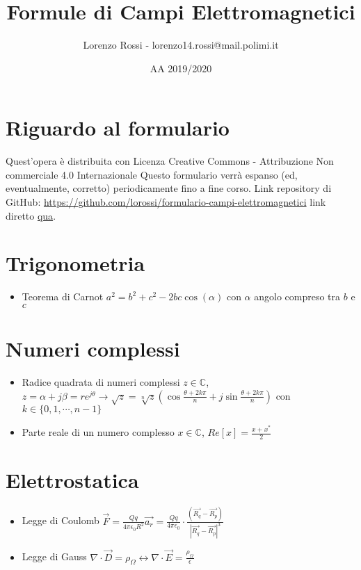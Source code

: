\documentclass{article}
\title{Formule di Campi Elettromagnetici}
\author{Lorenzo Rossi - lorenzo14.rossi@mail.polimi.it}
\date{AA 2019/2020}
\begin{document}
\maketitle

\section{Riguardo al formulario}
Quest'opera è distribuita con Licenza Creative Commons - Attribuzione Non commerciale 4.0 Internazionale \ccbynceu  \newline
Questo formulario verrà espanso (ed, eventualmente, corretto) periodicamente fino a fine corso.
Link repository di GitHub: \url{https://github.com/lorossi/formulario-campi-elettromagnetici} link diretto \href{https://github.com/lorossi/formulario-campi-elettromagnetici/blob/master/formule_campi.pdf}{qua}. \newline 

\section{Trigonometria}
\begin{itemize}
	\item Teorema di Carnot \( a^2 = b^2 + c^2 - 2bc\cos(\alpha)\) con \(\alpha\) angolo compreso tra \(b\) e \(c\) 
\end{itemize}

\section{Numeri complessi}
\begin{itemize}
	\item Radice quadrata di numeri complessi \(z \in \mathbb{C}\), \( z = \alpha + j \beta = r e^{j \theta} \rightarrow \sqrt{z} = \sqrt[n]{z} ( \cos{\frac{\theta + 2k\pi}{n}} + j \sin{\frac{\theta + 2 k \pi}{n}} ) \) \newline con \(k \in \{0, 1, \cdots, n-1 \} \)
	\item Parte reale di un numero complesso \(x \in \mathbb{C}\), \(Re[x] = \frac{x + x^{*}}{2} \)
\end{itemize}

\section{Elettrostatica}
\begin{itemize}
	\item Legge di Coulomb \( \vec{F} = \frac{Qq}{4 \pi \epsilon_0 R^2} \vec{a_r} = \frac{Qq}{4 \pi \epsilon_0} \cdot \frac{(\vec{R_q} - \vec{R_p})}{| \vec{R_q} - \vec{R_p} | ^3 } \)
	\item Legge di Gauss \( \nabla \cdot \vec{D} = \rho_\Omega \leftrightarrow \nabla \cdot \vec{E} = \frac{\rho_\Omega}{\epsilon} \)
\end{itemize}
\end{document}
